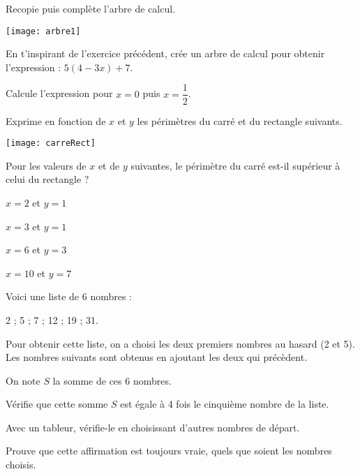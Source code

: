 \begin{exercice}
Recopie puis complète l'arbre de calcul.
\begin{center}
    \texttt{[image: arbre1]}
\end{center}
\end{exercice}


\begin{exercice}[À l'envers !]

\begin{colenumerate}{1} 
\item En t'inspirant de l'exercice précédent, crée un arbre de calcul pour obtenir l'expression : $5(4 - 3x) + 7$.
\item Calcule l'expression pour $x = 0$ puis $x =\dfrac{1}{2}$.
\end{colenumerate} 
\end{exercice}


\begin{exercice}
Exprime en fonction de $x$ et $y$ les périmètres du carré et du rectangle suivants.

\begin{center}
    \texttt{[image: carreRect]}
\end{center}

Pour les valeurs de $x$ et de $y$ suivantes, le périmètre du carré est-il supérieur à celui du rectangle ?

\begin{colenumerate}{1} 
\item $x = 2$ et $y = 1$
\item $x = 3$ et $y = 1$
\item $x = 6$ et $y = 3$
\item $x = 10$ et $y = 7$
\end{colenumerate} 
\end{exercice}


\begin{exercice}

Voici une liste de 6 nombres :

2 ; 5 ; 7 ; 12 ; 19 ; 31.

Pour obtenir cette liste, on a choisi les deux premiers nombres au hasard (2 et 5). Les nombres suivants sont obtenus en ajoutant les deux qui précèdent. 

On note $S$ la somme de ces 6 nombres.

\begin{colenumerate}{1} 
\item Vérifie que cette somme $S$ est égale à 4 fois le cinquième nombre de la liste.
\item Avec un tableur, vérifie-le en choisissant d'autres nombres de départ.
\item Prouve que cette affirmation est toujours vraie, quels que soient les nombres choisis.
\end{colenumerate} 
\end{exercice}

